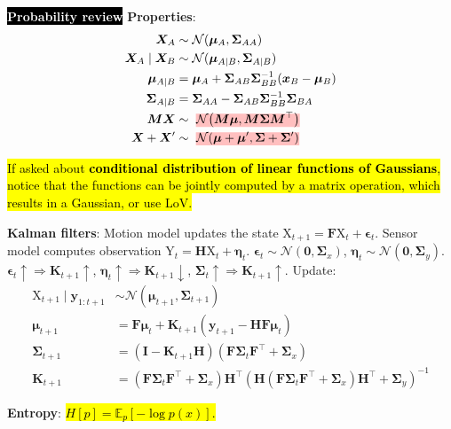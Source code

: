 \documentclass{article}
\DeclareRobustCommand{\hleq}[1]{{\sethlcolor{pink} \hl{#1}}}
\newcommand{\lft}{\mathopen{}\left}
\newcommand{\rgt}{\aftergroup\mathclose\aftergroup{\aftergroup}\right}
\newcommand{\E}{\mathbb{E}}
\newenvironment{topic}[1]
{\textbf{\sffamily  \colorbox{black}{\textcolor{white}{#1}}}}
{}
\begin{document}
\begin{multicols*}{3}
\begin{topic}{Probability review}
    \textbf{Properties}: \begin{align*}
      \bm{X}_A &\sim \mathcal{N}(\bm{\mu}_A, \bm{\Sigma}_{AA}) \\
      \bm{X}_A \mid \bm{X}_B &\sim \mathcal{N}(\bm{\mu}_{A\mid B}, \bm{\Sigma}_{A\mid B}) \\
      \bm{\mu}_{A\mid B} &= \bm{\mu}_A + \bm{\Sigma}_{AB} \bm{\Sigma}_{BB}^{-1} (\bm{x}_B - \bm{\mu}_B) \\
      \bm{\Sigma}_{A\mid B} &= \bm{\Sigma}_{AA} - \bm{\Sigma}_{AB} \bm{\Sigma}_{BB}^{-1} \bm{\Sigma}_{BA} \\
      \bm{M}\bm{X} &\sim \text{\hleq{$\mathcal{N} \lft( \bm{M}\bm{\mu}, \bm{M}\bm{\Sigma}\bm{M}^\top \rgt)$}} \\
      \bm{X} + \bm{X}' &\sim \text{\hleq{$\mathcal{N}(\bm{\mu} + \bm{\mu}', \bm{\Sigma} + \bm{\Sigma}')$}}
    \end{align*}

    \hl{If asked about \textbf{conditional distribution of linear functions of
    Gaussians}, notice that the functions can be jointly computed by a matrix
    operation, which results in a Gaussian, or use LoV.}

    \textbf{Kalman filters}: Motion model updates the state $\mathrm{X}_{t+1} =
    \bm{F}\mathrm{X}_t + \bm{\epsilon}_t$. Sensor model computes observation
    $\mathrm{Y}_t = \bm{H} \mathrm{X}_t + \bm{\eta}_t$. $\bm{\epsilon}_t \sim
    \mathcal{N}(\bm{0},\bm{\Sigma}_x)$, $\bm{\eta}_t \sim
    \mathcal{N}(\bm{0},\bm{\Sigma}_y)$. $\bm{\epsilon}_t \uparrow \Rightarrow
    \bm{K}_{t+1} \uparrow$, $\bm{\eta}_t \uparrow \Rightarrow \bm{K}_{t+1}
    \downarrow$, $\bm{\Sigma}_t \uparrow \Rightarrow \bm{K}_{t+1} \uparrow$.
    Update: \begin{align*}
      \mathrm{X}_{t+1} \mid \bm{y}_{1:t+1} &\sim \mathcal{N}(\bm{\mu}_{t+1},\bm{\Sigma}_{t+1}) \\
      \bm{\mu}_{t+1} &= \bm{F}\bm{\mu}_t + \bm{K}_{t+1} (\bm{y}_{t+1} - \bm{H}\bm{F}\bm{\mu}_t) \\
      \bm{\Sigma}_{t+1} &= (\bm{I} - \bm{K}_{t+1} \bm{H}) (\bm{F}\bm{\Sigma}_t \bm{F}^\top + \bm{\Sigma}_x) \\
      \bm{K}_{t+1} &= (\bm{F}\bm{\Sigma}_t \bm{F}^\top + \bm{\Sigma}_x) \bm{H}^\top (\bm{H}(\bm{F}\bm{\Sigma}_t\bm{F}^\top + \bm{\Sigma}_x) \bm{H}^\top + \bm{\Sigma}_y)^{-1}
    \end{align*}

    \textbf{Entropy}: \hleq{$H[p] = \E_p[-\log p(x)]$.}


\end{topic}
\end{multicols*}
\end{document}
